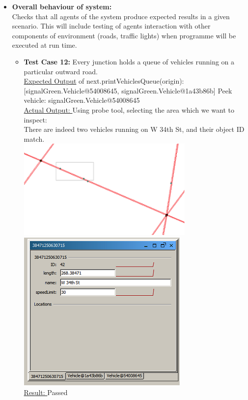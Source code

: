 \documentclass[11pt]{article}
\begin{document}
\begin{enumerate}
\begin{itemize}
\item \textbf{Overall behaviour of system: }\hfill \\
Checks that all agents of the system produce expected results in a given scenario. This will include testing of agents interaction with other components of environment (roads, traffic lights) when programme will be executed at run time.\hfill \\
\begin{itemize}
\item \textbf{Test Case 12:} Every junction holds a queue of vehicles running on a particular outward road.\hfill \\
\underline{Expected Output} of next.printVehiclesQueue(origin):[signalGreen.Vehicle@54008645, signalGreen.Vehicle@1a43b86b] Peek vehicle: signalGreen.Vehicle@54008645\hfill \\
\underline{Actual Output: }Using probe tool, selecting the area which we want to inspect:\hfill \\
There are indeed two vehicles running on W 34th St, and their object ID match.\hfill \\
\includegraphics[scale=0.7]{RoadNetwork}
\includegraphics{Sim}\hfill \\
\underline{Result: }Passed
\end{itemize}
\end{itemize}

\end{enumerate}
\end{document}
